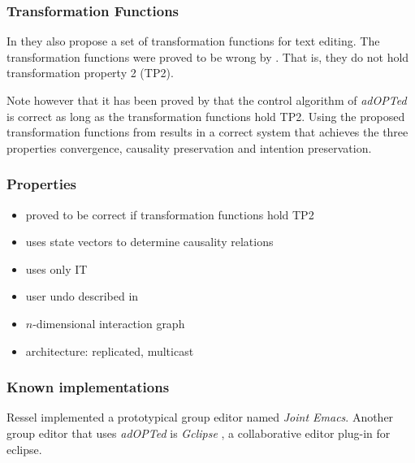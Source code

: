 \subsubsection{Transformation Functions}
In \cite{ressel96} they also propose a set of transformation functions for text editing. The transformation functions were proved to be wrong by \cite{imine03}. That is, they do not hold transformation property 2 (TP2). 

Note however that it has been proved by \cite{cormack02} that the control algorithm of \emph{adOPTed} is correct as long as the transformation functions hold TP2. Using the proposed transformation functions from \cite{imine04} results in a correct system that achieves the three properties convergence, causality preservation and intention preservation.


\subsubsection{Properties}
\begin{itemize}
 \item proved to be correct if transformation functions hold TP2
 \item uses state vectors to determine causality relations
 \item uses only IT
 \item user undo described in \cite{ressel99}
 \item $n$-dimensional interaction graph
 \item architecture: replicated, multicast
\end{itemize}


\subsubsection{Known implementations}
Ressel implemented a prototypical group editor named \emph{Joint Emacs}. Another group editor that uses \emph{adOPTed} is \emph{Gclipse} \cite{cicolini}, a collaborative editor plug-in for eclipse.

